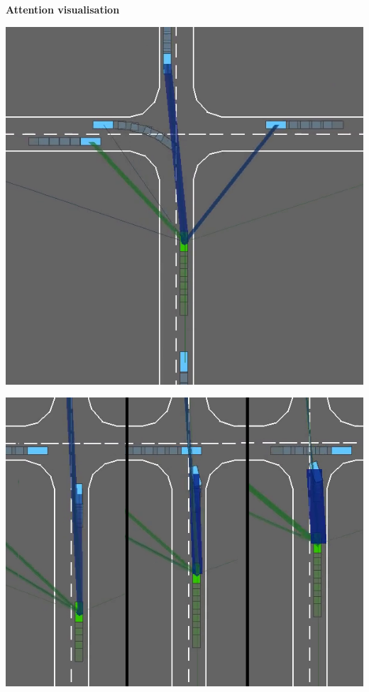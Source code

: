 \documentclass[paperwidth=36in,paperheight=48in,portrait,fontscale=0.3, margin=2cm]{baposter}
\begin{document}
\begin{poster}
{\begin{center}
\textbf{Attention visualisation}

\begin{minipage}[b]{0.26\textwidth}
\includegraphics[width=\linewidth]{../img/head_specialization}
\end{minipage}
\begin{minipage}[b]{0.28\textwidth}
	\includegraphics[width=\linewidth]{../img/distances}

\end{minipage}
\end{center}}
\end{poster}
\end{document}
